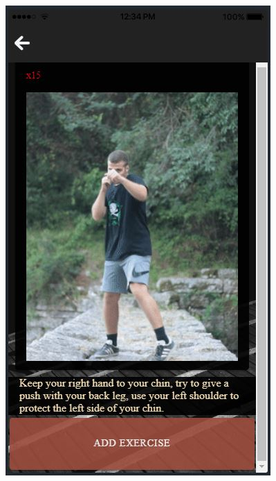 \documentclass[a4paper,12pt]{article}
\begin{document}
\begin{figure}[!htb]
				\endminipage\hfill
				  \includegraphics[width=\linewidth]{plan3}
				  

\end{figure}
\end{document}
